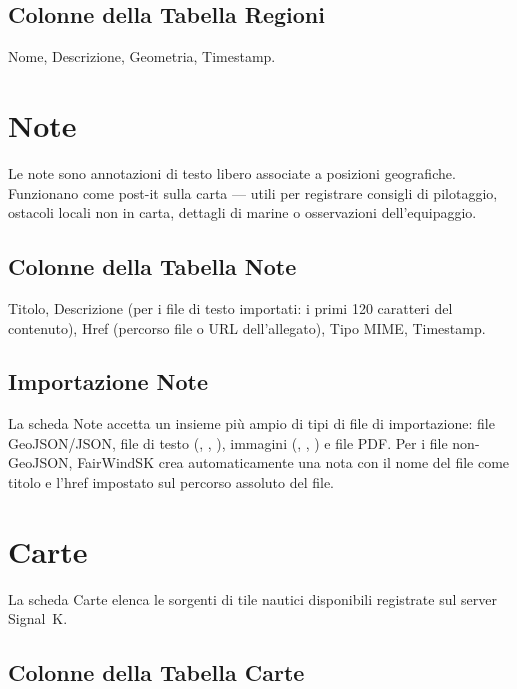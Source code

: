 \section{Colonne della Tabella Regioni}

Nome, Descrizione, Geometria, Timestamp.

\chapter{Note}
\label{ch:note}

Le note sono annotazioni di testo libero associate a posizioni geografiche.
Funzionano come post-it sulla carta --- utili per registrare consigli di pilotaggio,
ostacoli locali non in carta, dettagli di marine o osservazioni dell'equipaggio.


\section{Colonne della Tabella Note}

Titolo, Descrizione (per i file di testo importati: i primi 120 caratteri del contenuto),
Href (percorso file o URL dell'allegato), Tipo MIME, Timestamp.

\section{Importazione Note}

La scheda Note accetta un insieme più ampio di tipi di file di importazione:
file GeoJSON/JSON, file di testo (, , ), immagini
(, , ) e file PDF.
Per i file non-GeoJSON, FairWindSK crea automaticamente una nota con il nome del file
come titolo e l'href impostato sul percorso assoluto del file.

\chapter{Carte}
\label{ch:carte}

La scheda Carte elenca le sorgenti di tile nautici disponibili registrate sul server Signal~K.


\section{Colonne della Tabella Carte}

